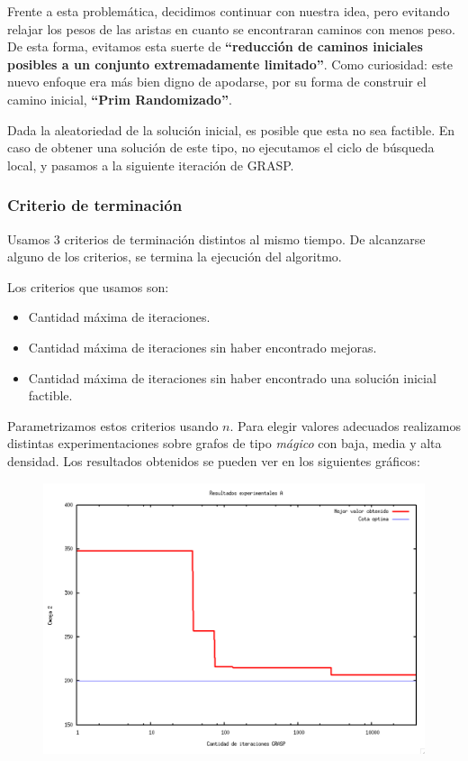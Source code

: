 Frente a esta problemática, decidimos continuar con nuestra idea, pero evitando relajar los pesos de las aristas en cuanto se encontraran caminos con menos peso. De esta forma, evitamos esta suerte de \textbf{``reducción de caminos iniciales posibles a un conjunto extremadamente limitado''}. Como curiosidad: este nuevo enfoque era más bien digno de apodarse, por su forma de construir el camino inicial, \textbf{``Prim Randomizado''}.

Dada la aleatoriedad de la solución inicial, es posible que esta no sea factible. En caso de obtener una solución de este tipo, no ejecutamos el ciclo de búsqueda local, y pasamos a la siguiente iteración de GRASP.

\subsubsection{Criterio de terminación}

Usamos 3 criterios de terminación distintos al mismo tiempo. De alcanzarse alguno de los criterios, se termina la ejecución del algoritmo.

Los criterios que usamos son:
\begin{itemize}
\item Cantidad máxima de iteraciones.
\item Cantidad máxima de iteraciones sin haber encontrado mejoras.
\item Cantidad máxima de iteraciones sin haber encontrado una solución inicial factible.
\end{itemize}

Parametrizamos estos criterios usando $n$. Para elegir valores adecuados realizamos distintas experimentaciones sobre grafos de tipo \textit{mágico} con baja, media y alta densidad. Los resultados obtenidos se pueden ver en los siguientes gráficos:

\begin{figure}[H]
\begin{center}
\includegraphics[angle=0, scale=.5]{imagenes/iteraciones-GRASP-A.png}
\label{Resultados experimentales A}
\end{center}
\end{figure}


